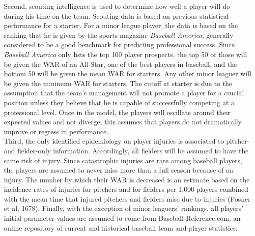 \documentclass[12pt]{article}
\begin{document}
Second, scouting intelligence is used to determine how well a player will do during his time on the team.  Scouting data is based on previous statistical performance for a starter.  For a minor league player, the data is based on the ranking that he is given by the sports magazine \textit{Baseball America}, generally considered to be a good benchmark for predicting professional success.  Since \textit{Baseball America} only lists the top 100 player prospects, the top 50 of those will be given the WAR of an All-Star, one of the best players in baseball, and the bottom 50 will be given the mean WAR for starters.  Any other minor leaguer will be given the minimum WAR for starters.  The cutoff at starter is due to the assumption that the team's management will not promote a player for a crucial position unless they believe that he is capable of successfully competing at a professional level.  Once in the model, the players will oscillate around their expected values and not diverge; this assumes that players do not dramatically improve or regress in performance.  \\

Third, the only identified epidemiology on player injuries is associated to pitcher- and fielder-only information.  Accordingly, all fielders will be assumed to have the same risk of injury.  Since catastrophic injuries are rare among baseball players, the players are assumed to never miss more than a full season because of an injury.  The number by which their WAR is decreased is an estimate based on the incidence rates of injuries for pitchers and for fielders per 1,000 players combined with the mean time that injured pitchers and fielders miss due to injuries (Posner et al. 1678).  Finally, with the exception of minor leaguers' rankings, all players' initial parameter values are assumed to come from Baseball-Reference.com, an online repository of current and historical baseball team and player statistics.  \\
\end{document}
